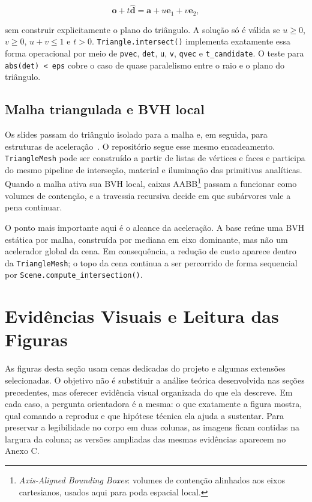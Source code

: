 \documentclass[portuguese]{sbcreviews-2025}%
\makeatletter
\newcommand{\slideurl}[1]{%
    \ifcsname slideurl@#1\endcsname
        \csname slideurl@#1\endcsname
    \else
        #1
    \fi
}
\newcommand{\slidescite}[2]{\citep[\href{\slideurl{#1}}{pp.~#2}]{#1}}
\makeatother
\begin{document}
\[
\mathbf{o}+t\hat{\mathbf{d}} = \mathbf{a}+u\mathbf{e}_1+v\mathbf{e}_2,
\]

sem construir explicitamente o plano do triângulo. A solução só é válida se \(u\ge 0\), \(v\ge 0\), \(u+v\le 1\) e \(t>0\). \texttt{Triangle.intersect()} implementa exatamente essa forma operacional por meio de \texttt{pvec}, \texttt{det}, \texttt{u}, \texttt{v}, \texttt{qvec} e \texttt{t\_candidate}. O teste para \texttt{abs(det) < eps} cobre o caso de quase paralelismo entre o raio e o plano do triângulo.

\subsection{Malha triangulada e BVH local}
\label{sec:mesh-bvh-v3}

Os slides passam do triângulo isolado para a malha e, em seguida, para estruturas de aceleração~\slidescite{inf2608slides06}{13--36}. O repositório segue esse mesmo encadeamento. \texttt{TriangleMesh} pode ser construído a partir de listas de vértices e faces e participa do mesmo pipeline de interseção, material e iluminação das primitivas analíticas. Quando a malha ativa sua BVH local, caixas AABB\footnote{\emph{Axis-Aligned Bounding Boxes}: volumes de contenção alinhados aos eixos cartesianos, usados aqui para poda espacial local.} passam a funcionar como volumes de contenção, e a travessia recursiva decide em que subárvores vale a pena continuar.

O ponto mais importante aqui é o alcance da aceleração. A base reúne uma BVH estática por malha, construída por mediana em eixo dominante, mas não um acelerador global da cena. Em consequência, a redução de custo aparece dentro da \texttt{TriangleMesh}; o topo da cena continua a ser percorrido de forma sequencial por \texttt{Scene.compute\_intersection()}.

\section{Evidências Visuais e Leitura das Figuras}
\label{sec:evidencias-v3}

As figuras desta seção usam cenas dedicadas do projeto e algumas extensões selecionadas. O objetivo não é substituir a análise teórica desenvolvida nas seções precedentes, mas oferecer evidência visual organizada do que ela descreve. Em cada caso, a pergunta orientadora é a mesma: o que exatamente a figura mostra, qual comando a reproduz e que hipótese técnica ela ajuda a sustentar. Para preservar a legibilidade no corpo em duas colunas, as imagens ficam contidas na largura da coluna; as versões ampliadas das mesmas evidências aparecem no Anexo C.
\end{document}
